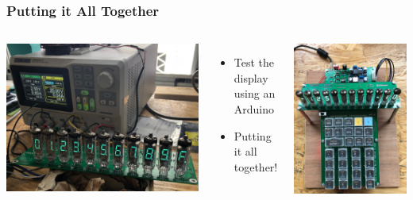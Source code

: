\documentclass{beamer}
\begin{document}
\begin{frame}
  \frametitle{Putting it All Together}


  \begin{columns}
    \includegraphics[width=\textwidth]{figs/display_11.jpg}
    \begin{itemize}
    \scriptsize
    \item Test the display using an Arduino
    \item Putting it all together!
    \end{itemize}
    \includegraphics[width=\textwidth]{figs/top_with_ps.jpg} \\
  \end{columns}
        

\end{frame}
\end{document}
